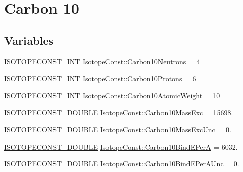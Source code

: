 \hypertarget{group___isotope_const-_carbon-_c10}{}\section{Carbon 10}
\label{group___isotope_const-_carbon-_c10}
\subsection*{Variables}
\begin{DoxyCompactItemize}
\item 
\mbox{\hyperlink{group___isotope_const-_macros_ga5f18360b3e99483a35c32d789e62621c}{I\+S\+O\+T\+O\+P\+E\+C\+O\+N\+S\+T\+\_\+\+I\+NT}} \mbox{\hyperlink{group___isotope_const-_carbon-_c10_gaf21f30df58a2d0ade0b9c7b1cb47515b}{Isotope\+Const\+::\+Carbon10\+Neutrons}} = 4
\item 
\mbox{\hyperlink{group___isotope_const-_macros_ga5f18360b3e99483a35c32d789e62621c}{I\+S\+O\+T\+O\+P\+E\+C\+O\+N\+S\+T\+\_\+\+I\+NT}} \mbox{\hyperlink{group___isotope_const-_carbon-_c10_ga1d4bf7ad6bbf0257c909f63882f34ae7}{Isotope\+Const\+::\+Carbon10\+Protons}} = 6
\item 
\mbox{\hyperlink{group___isotope_const-_macros_ga5f18360b3e99483a35c32d789e62621c}{I\+S\+O\+T\+O\+P\+E\+C\+O\+N\+S\+T\+\_\+\+I\+NT}} \mbox{\hyperlink{group___isotope_const-_carbon-_c10_ga2c600bac2b9d9c40459224079502c8f9}{Isotope\+Const\+::\+Carbon10\+Atomic\+Weight}} = 10
\item 
\mbox{\hyperlink{group___isotope_const-_macros_ga8f45a7272ce02c0b4c65c44636ed719a}{I\+S\+O\+T\+O\+P\+E\+C\+O\+N\+S\+T\+\_\+\+D\+O\+U\+B\+LE}} \mbox{\hyperlink{group___isotope_const-_carbon-_c10_ga22db2e09a0d8254c9a209933d21d68dd}{Isotope\+Const\+::\+Carbon10\+Mass\+Exc}} = 15698.
\item 
\mbox{\hyperlink{group___isotope_const-_macros_ga8f45a7272ce02c0b4c65c44636ed719a}{I\+S\+O\+T\+O\+P\+E\+C\+O\+N\+S\+T\+\_\+\+D\+O\+U\+B\+LE}} \mbox{\hyperlink{group___isotope_const-_carbon-_c10_ga6943638da5b5566e5a02cb5d623312d4}{Isotope\+Const\+::\+Carbon10\+Mass\+Exc\+Unc}} = 0.
\item 
\mbox{\hyperlink{group___isotope_const-_macros_ga8f45a7272ce02c0b4c65c44636ed719a}{I\+S\+O\+T\+O\+P\+E\+C\+O\+N\+S\+T\+\_\+\+D\+O\+U\+B\+LE}} \mbox{\hyperlink{group___isotope_const-_carbon-_c10_ga75da6aa0fb133ff8f904101ffda4ca8f}{Isotope\+Const\+::\+Carbon10\+Bind\+E\+PerA}} = 6032.
\item 
\mbox{\hyperlink{group___isotope_const-_macros_ga8f45a7272ce02c0b4c65c44636ed719a}{I\+S\+O\+T\+O\+P\+E\+C\+O\+N\+S\+T\+\_\+\+D\+O\+U\+B\+LE}} \mbox{\hyperlink{group___isotope_const-_carbon-_c10_gad8d111d7facfb72ac1f70e3885ef8411}{Isotope\+Const\+::\+Carbon10\+Bind\+E\+Per\+A\+Unc}} = 0.

\end{DoxyCompactItemize}
